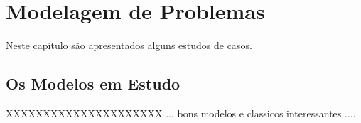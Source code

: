 
\chapter{Modelagem de Problemas}
\label{cp:mp}


Neste capítulo são apresentados alguns estudos de casos.

\section{Os Modelos em Estudo}

XXXXXXXXXXXXXXXXXXXXX ... bons modelos e classicos  interessantes ....


